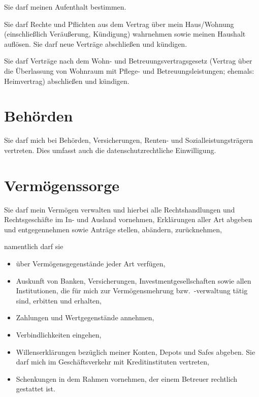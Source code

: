 \documentclass[pdftex,12pt,a4paper]{article}
\begin{document}
Sie darf meinen Aufenthalt bestimmen. 

Sie darf Rechte und Pflichten aus dem Vertrag über mein Haus/Wohnung
(einschließlich Veräußerung, Kündigung) wahrnehmen sowie meinen Haushalt auflösen. 
Sie darf neue Verträge abschließen und kündigen.

 
 
Sie darf Verträge nach dem Wohn- und Betreuungsvertragsgesetz
(Vertrag über die Überlassung von Wohnraum mit Pflege- und Betreuungsleistungen; ehemals: Heimvertrag) abschließen und kündigen. 


\section{Behörden}

Sie darf mich bei Behörden, Versicherungen, Renten- und Sozialleistungsträgern vertreten. Dies umfasst auch die 
datenschutzrechtliche Einwilligung.

 

\section{Vermögenssorge}

Sie darf mein Vermögen verwalten und hierbei alle Rechtshandlungen und
Rechtsgeschäfte im In- und Ausland vornehmen, Erklärungen aller Art abgeben
und entgegennehmen sowie Anträge stellen, abändern, zurücknehmen, 

namentlich darf sie

\begin{itemize}

\item über Vermögensgegenstände jeder Art verfügen,
 
 \item Auskunft von Banken, Versicherungen, Investmentgesellschaften
 sowie allen Institutionen, die für mich zur Vermögensmehrung 
 bzw.\ -verwaltung tätig sind, erbitten und erhalten,

\item Zahlungen und Wertgegenstände annehmen,

\item Verbindlichkeiten eingehen,

\item Willenserklärungen bezüglich meiner Konten, Depots und Safes abgeben. Sie darf
mich im Geschäftsverkehr mit Kreditinstituten vertreten,

\item Schenkungen in dem Rahmen vornehmen, der einem Betreuer rechtlich gestattet ist. 

\end{itemize}
\end{document}
